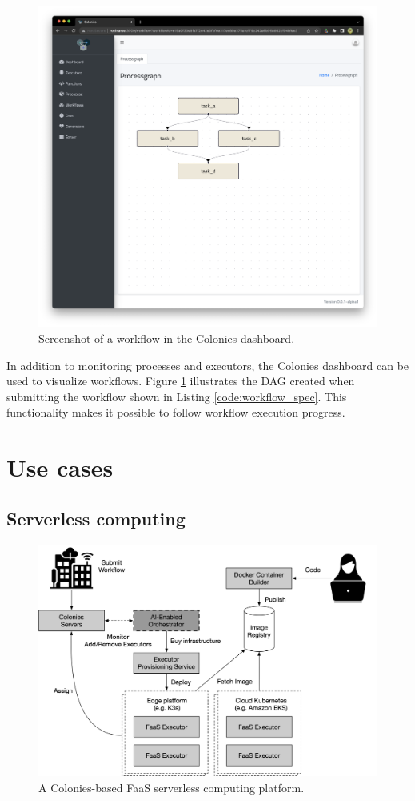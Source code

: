 \documentclass{article}
\begin{document}
\begin{figure}[h]
	\centering
    \includegraphics[scale=0.23]{dashboard2.png}
	\caption{Screenshot of a workflow in the Colonies dashboard.}
	\label{fig:dashboard2}
\end{figure}

In addition to monitoring processes and executors, the Colonies dashboard can be used to visualize workflows. Figure \ref{fig:dashboard2} illustrates the DAG created when submitting the workflow shown in Listing \ref{code:workflow_spec}. This functionality makes it possible to follow workflow execution progress.

\section{Use cases}
\subsection{Serverless computing}
\label{faas}

\begin{figure}[h]
	\centering
    \includegraphics[scale=0.44]{cognite_faas.png}
	\caption{A Colonies-based FaaS serverless computing platform.}
	\label{fig:ha_deployment}
\end{figure}
\end{document}
